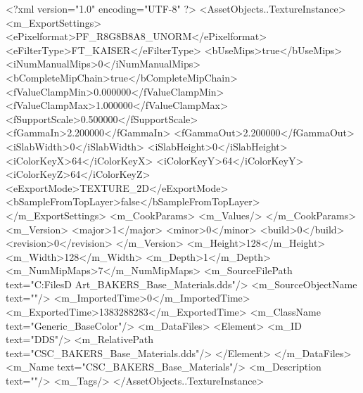 <?xml version="1.0" encoding="UTF-8" ?>
<AssetObjects..TextureInstance>
	<m_ExportSettings>
		<ePixelformat>PF_R8G8B8A8_UNORM</ePixelformat>
		<eFilterType>FT_KAISER</eFilterType>
		<bUseMips>true</bUseMips>
		<iNumManualMips>0</iNumManualMips>
		<bCompleteMipChain>true</bCompleteMipChain>
		<fValueClampMin>0.000000</fValueClampMin>
		<fValueClampMax>1.000000</fValueClampMax>
		<fSupportScale>0.500000</fSupportScale>
		<fGammaIn>2.200000</fGammaIn>
		<fGammaOut>2.200000</fGammaOut>
		<iSlabWidth>0</iSlabWidth>
		<iSlabHeight>0</iSlabHeight>
		<iColorKeyX>64</iColorKeyX>
		<iColorKeyY>64</iColorKeyY>
		<iColorKeyZ>64</iColorKeyZ>
		<eExportMode>TEXTURE_2D</eExportMode>
		<bSampleFromTopLayer>false</bSampleFromTopLayer>
	</m_ExportSettings>
	<m_CookParams>
		<m_Values/>
	</m_CookParams>
	<m_Version>
		<major>1</major>
		<minor>0</minor>
		<build>0</build>
		<revision>0</revision>
	</m_Version>
	<m_Height>128</m_Height>
	<m_Width>128</m_Width>
	<m_Depth>1</m_Depth>
	<m_NumMipMaps>7</m_NumMipMaps>
	<m_SourceFilePath text="C:\Users\Shadow\Desktop\Working Files\2D Art\Adjacencies\CSC_BAKERS_Base_Materials.dds"/>
	<m_SourceObjectName text=""/>
	<m_ImportedTime>0</m_ImportedTime>
	<m_ExportedTime>1383288283</m_ExportedTime>
	<m_ClassName text="Generic_BaseColor"/>
	<m_DataFiles>
		<Element>
			<m_ID text="DDS"/>
			<m_RelativePath text="CSC_BAKERS_Base_Materials.dds"/>
		</Element>
	</m_DataFiles>
	<m_Name text="CSC_BAKERS_Base_Materials"/>
	<m_Description text=""/>
	<m_Tags/>
</AssetObjects..TextureInstance>

